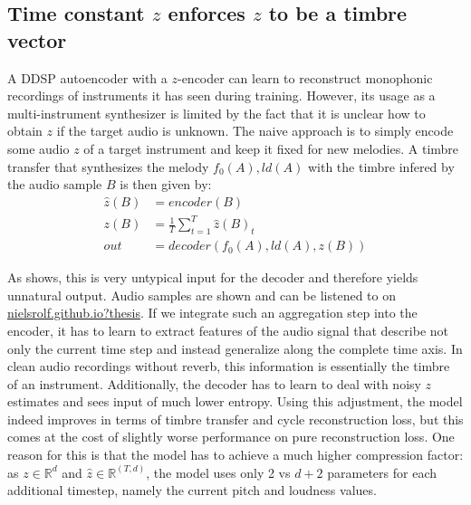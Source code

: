 \subsection{Time constant $z$ enforces $z$ to be a timbre vector}
\label{time-constant-z}
A DDSP autoencoder with a $z$-encoder can learn to reconstruct monophonic recordings of instruments it has seen during training.
However, its usage as a multi-instrument synthesizer is limited by the fact that it is unclear how to obtain $z$ if the target audio is unknown.
The naive approach is to simply encode some audio $z$ of a target instrument and keep it fixed for new melodies.
A timbre transfer that synthesizes the melody $f_0(A), ld(A)$ with the timbre infered by the audio sample $B$ is then given by:
\begin{equation}
    \begin{split}
        \hat{z}(B) &= encoder(B) \\
        z(B) &= \frac{1}{T} \sum_{t=1}^{T} \hat{z}(B)_t \\
        out &= decoder(f_0(A), ld(A), z(B))
    \end{split}
\end{equation}


As  shows, this is very untypical input for the decoder and therefore yields unnatural output. Audio samples are shown  and can be listened to on \href{http://nielsrolf.github.io?thesis}{nielsrolf.github.io?thesis}. \newline
If we integrate such an aggregation step into the encoder, it has to learn to extract features of the audio signal that describe not only the current time step and instead generalize along the complete time axis.
In clean audio recordings without reverb, this information is essentially the timbre of an instrument.
Additionally, the decoder has to learn to deal with noisy $z$ estimates and sees input of much lower entropy.
Using this adjustment, the model indeed improves in terms of timbre transfer and cycle reconstruction loss, but this comes at the cost of slightly worse performance on pure reconstruction loss. \newline
One reason for this is that the model has to achieve a much higher compression factor: as $z \in \mathbb{R}^d$ and $\hat{z}\in \mathbb{R}^{(T, d)}$, the model uses only 2 vs $d + 2$ parameters for each additional timestep, namely the current pitch and loudness values.


